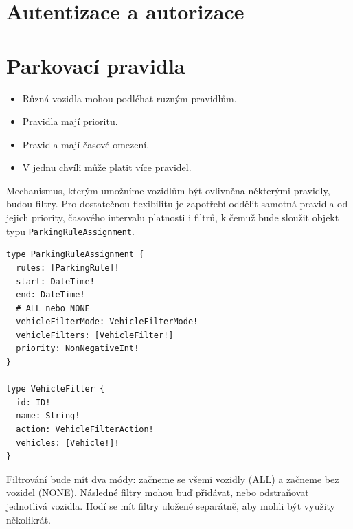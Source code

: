 
\section{Autentizace a autorizace} \label{db_schema}


\section{Parkovací pravidla} \label{analysis_parking_schema}

\begin{itemize}
  \item Různá vozidla mohou podléhat ruzným pravidlům.
  \item Pravidla mají prioritu.
  \item Pravidla mají časové omezení.
  \item V jednu chvíli může platit více pravidel.
\end{itemize}

Mechanismus, kterým umožníme vozidlům být ovlivněna některými pravidly,
budou filtry.
Pro dostatečnou flexibilitu je zapotřebí oddělit samotná pravidla od jejich
priority, časového intervalu platnosti i filtrů,
k čemuž bude sloužit objekt typu \texttt{ParkingRuleAssignment}.

\begin{lstlisting}
type ParkingRuleAssignment {
  rules: [ParkingRule]!
  start: DateTime!
  end: DateTime!
  # ALL nebo NONE
  vehicleFilterMode: VehicleFilterMode!
  vehicleFilters: [VehicleFilter!]
  priority: NonNegativeInt!
}

type VehicleFilter {
  id: ID!
  name: String!
  action: VehicleFilterAction!
  vehicles: [Vehicle!]!
}
\end{lstlisting}

Filtrování bude mít dva módy: začneme se všemi vozidly (ALL) a začneme bez vozidel (NONE).
Následné filtry mohou buď přidávat, nebo odstraňovat jednotlivá vozidla.
Hodí se mít filtry uložené separátně, aby mohli být využity několikrát.

